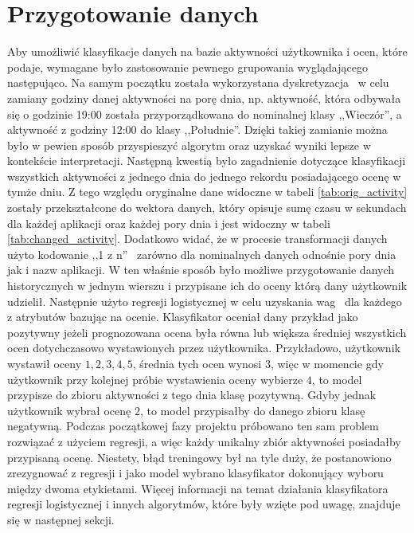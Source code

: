 \documentclass[a4paper,twoside,12pt]{book}
\begin{document}
\section{Przygotowanie danych}
\label{preparing}
Aby umożliwić klasyfikacje danych na bazie aktywności użytkownika i ocen, które podaje, wymagane było zastosowanie pewnego grupowania wyglądającego następująco. Na samym początku została wykorzystana dyskretyzacja~\cite{discretization} w celu zamiany godziny danej aktywności na porę dnia, np. aktywność, która odbywała się o godzinie 19:00 została przyporządkowana do nominalnej klasy ,,Wieczór'', a aktywność z godziny 12:00 do klasy ,,Południe''. Dzięki takiej zamianie można było w pewien sposób przyspieszyć algorytm oraz uzyskać wyniki lepsze w kontekście interpretacji. Następną kwestią było zagadnienie dotyczące klasyfikacji wszystkich aktywności z jednego dnia do jednego rekordu posiadającego ocenę w tymże dniu. Z tego względu oryginalne dane widoczne w tabeli \ref{tab:orig_activity} zostały przekształcone do wektora danych, który opisuje sumę czasu w sekundach dla każdej aplikacji oraz każdej pory dnia i jest widoczny w tabeli \ref{tab:changed_activity}. Dodatkowo widać, że w procesie transformacji danych użyto kodowanie ,,1 z n''~\cite{one_hot_encoding} zarówno dla nominalnych danych odnośnie pory dnia jak i nazw aplikacji. W ten właśnie sposób było możliwe przygotowanie danych historycznych w jednym wierszu i przypisane ich do oceny którą dany użytkownik udzielił. Następnie użyto regresji logistycznej w celu uzyskania wag~\cite{weights} dla każdego z atrybutów bazując na ocenie. Klasyfikator oceniał dany przykład jako pozytywny jeżeli prognozowana ocena była równa lub większa średniej wszystkich ocen dotychczasowo wystawionych przez użytkownika. Przykładowo, użytkownik wystawił oceny $1, 2, 3, 4, 5$, średnia tych ocen wynosi $3$, więc w momencie gdy użytkownik przy kolejnej próbie wystawienia oceny wybierze $4$, to model przypisze do zbioru aktywności z tego dnia klasę pozytywną. Gdyby jednak użytkownik wybrał ocenę $2$, to model przypisałby do danego zbioru klasę negatywną. Podczas początkowej fazy projektu próbowano ten sam problem rozwiązać z użyciem regresji, a więc każdy unikalny zbiór aktywności posiadałby przypisaną ocenę. Niestety, błąd treningowy był na tyle duży, że postanowiono zrezygnować z regresji i jako model wybrano klasyfikator dokonujący wyboru między dwoma etykietami. Więcej informacji na temat działania klasyfikatora regresji logistycznej i innych algorytmów, które były wzięte pod uwagę, znajduje się w następnej sekcji. 
\end{document}
